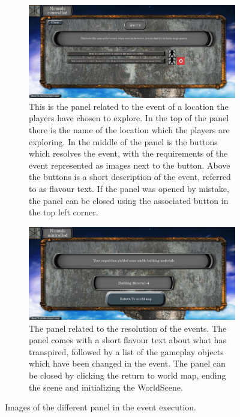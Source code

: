 \begin{figure}[!ht]
    \centering
    \begin{subfigure}[b]{\textwidth}
        \includegraphics[width=\textwidth]{Images/EventPanel.png}
        \caption{This is the panel related to the event of a location the players have chosen to explore. In the top of the panel there is the name of the location which the players are exploring.
       In the middle of the panel is the buttons which resolves the event, with the requirements of the event represented as images next to the button.
        Above the buttons is a short description of the event, referred to as flavour text. If the panel was opened by mistake, the panel can be closed using the associated button in the top left corner. }
        \label{fig:evepan}
    \end{subfigure}
    \begin{subfigure}[b]{\textwidth}
        \includegraphics[width=\textwidth]{Images/EventResolution.png}
        \caption{The panel related to the resolution of the events. The panel comes with a short flavour text about what has transpired, followed by a list of the gameplay objects which have been changed in the event. The panel can be closed by clicking the return to world map, ending the scene and initializing the WorldScene.}
        \label{fig:everes}
    \end{subfigure}
    \caption{Images of the different panel in the event execution.}
    \label{fig:eventPans}
\end{figure}

